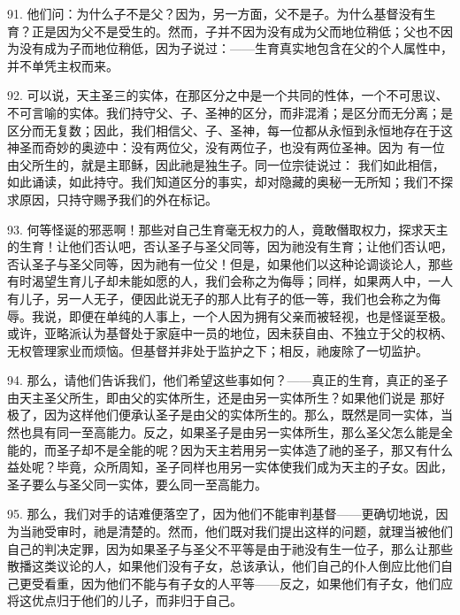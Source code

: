 91. 他们问：为什么子不是父？因为，另一方面，父不是子。为什么基督没有生育？正是因为父不是受生的。然而，子并不因为没有成为父而地位稍低；父也不因为没有成为子而地位稍低，因为子说过：——生育真实地包含在父的个人属性中，并不单凭主权而来。\par

92. 可以说，天主圣三的实体，在那区分之中是一个共同的性体，一个不可思议、不可言喻的实体。我们持守父、子、圣神的区分，而非混淆；是区分而无分离；是区分而无复数；因此，我们相信父、子、圣神，每一位都从永恒到永恒地存在于这神圣而奇妙的奥迹中：没有两位父，没有两位子，也没有两位圣神。因为  有一位由父所生的，就是主耶稣，因此祂是独生子。同一位宗徒说过： 我们如此相信，如此诵读，如此持守。我们知道区分的事实，却对隐藏的奥秘一无所知；我们不探求原因，只持守赐予我们的外在标记。\par

93. 何等怪诞的邪恶啊！那些对自己生育毫无权力的人，竟敢僭取权力，探求天主的生育！让他们否认吧，否认圣子与圣父同等，因为祂没有生育；让他们否认吧，否认圣子与圣父同等，因为祂有一位父！但是，如果他们以这种论调谈论人，那些有时渴望生育儿子却未能如愿的人，我们会称之为侮辱；同样，如果两人中，一人有儿子，另一人无子，便因此说无子的那人比有子的低一等，我们也会称之为侮辱。我说，即便在单纯的人事上，一个人因为拥有父亲而被轻视，也是怪诞至极。或许，亚略派认为基督处于家庭中一员的地位，因未获自由、不独立于父的权柄、无权管理家业而烦恼。但基督并非处于监护之下；相反，祂废除了一切监护。\par

94. 那么，请他们告诉我们，他们希望这些事如何？——真正的生育，真正的圣子由天主圣父所生，即由父的实体所生，还是由另一实体所生？如果他们说是  那好极了，因为这样他们便承认圣子是由父的实体所生的。那么，既然是同一实体，当然也具有同一至高能力。反之，如果圣子是由另一实体所生，那么圣父怎么能是全能的，而圣子却不是全能的呢？因为天主若用另一实体造了祂的圣子，那又有什么益处呢？毕竟，众所周知，圣子同样也用另一实体使我们成为天主的子女。因此，圣子要么与圣父同一实体，要么同一至高能力。\par

95. 那么，我们对手的诘难便落空了，因为他们不能审判基督——更确切地说，因为当祂受审时，祂是清楚的。然而，他们既对我们提出这样的问题，就理当被他们自己的判决定罪，因为如果圣子与圣父不平等是由于祂没有生一位子，那么让那些散播这类议论的人，如果他们没有子女，总该承认，他们自己的仆人倒应比他们自己更受看重，因为他们不能与有子女的人平等——反之，如果他们有子女，他们应将这优点归于他们的儿子，而非归于自己。\par

